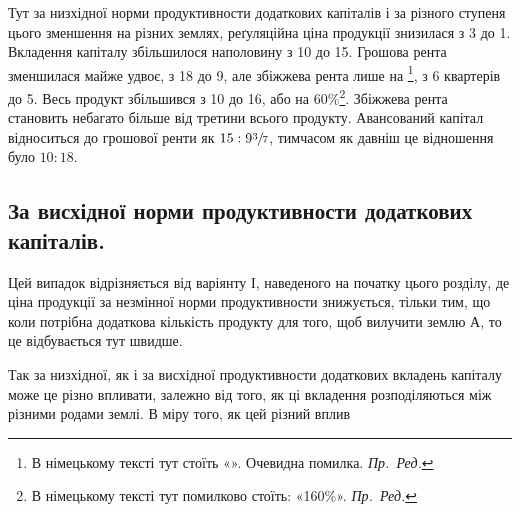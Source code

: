 
Тут за низхідної норми продуктивности додаткових капіталів і за різного
ступеня цього зменшення на різних землях, реґуляційна ціна продукції знизилася
з 3 до 1. Вкладення капіталу збільшилося наполовину з 10 до 15. Грошова рента зменшилася майже удвоє, з 18 до 9, але збіжжева рента лише на  \footnote*{
В німецькому тексті тут стоїть «». Очевидна помилка. \emph{Пр.~Ред.}
}, з 6 квартерів до 5. Весь продукт
збільшився з 10 до 16, або на 60\%\footnote*{
В німецькому тексті тут помилково стоїть: «160\%». \emph{Пр.~Ред.}
}. Збіжжева рента становить небагато більше
від третини всього продукту. Авансований капітал відноситься до грошової ренти
як $15: 9\sfrac{3}{7}$, тимчасом як давніш це відношення було $10:18$.

\subsection{За висхідної норми продуктивности додаткових капіталів.}

Цей випадок відрізняється від варіянту І, наведеного на початку цього
розділу, де ціна продукції за незмінної норми продуктивности знижується, тільки
тим, що коли потрібна додаткова кількість продукту для того, щоб вилучити
землю $А$, то це відбувається тут швидше.

Так за низхідної, як і за висхідної продуктивности додаткових вкладень
капіталу може це різно впливати, залежно від того, як ці вкладення розподіляються
між різними родами землі. В міру того, як цей різний вплив
\parbreak{}  %
